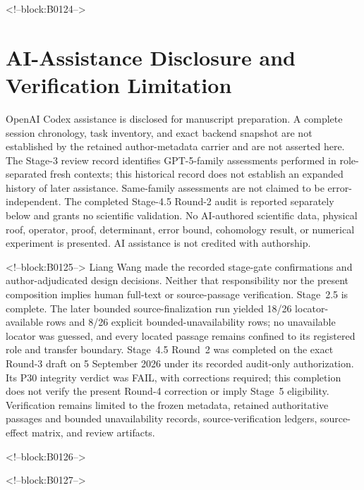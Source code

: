 \documentclass[11pt,a4paper]{article}
\begin{document}
<!--block:B0124-->
\section*{AI-Assistance Disclosure and Verification Limitation}
OpenAI Codex assistance is disclosed for manuscript preparation. A complete session chronology, task inventory, and exact backend snapshot are not established by the retained author-metadata carrier and are not asserted here. The Stage-3 review record identifies GPT-5-family assessments performed in role-separated fresh contexts; this historical record does not establish an expanded history of later assistance. Same-family assessments are not claimed to be error-independent. The completed Stage-4.5 Round-2 audit is reported separately below and grants no scientific validation. No AI-authored scientific data, physical roof, operator, proof, determinant, error bound, cohomology result, or numerical experiment is presented. AI assistance is not credited with authorship.

<!--block:B0125-->
Liang Wang made the recorded stage-gate confirmations and author-adjudicated design decisions. Neither that responsibility nor the present composition implies human full-text or source-passage verification. Stage~2.5 is complete. The later bounded source-finalization run yielded 18/26 locator-available rows and 8/26 explicit bounded-unavailability rows; no unavailable locator was guessed, and every located passage remains confined to its registered role and transfer boundary. Stage~4.5 Round~2 was completed on the exact Round-3 draft on 5 September 2026 under its recorded audit-only authorization. Its P30 integrity verdict was FAIL, with corrections required; this completion does not verify the present Round-4 correction or imply Stage~5 eligibility. Verification remains limited to the frozen metadata, retained authoritative passages and bounded unavailability records, source-verification ledgers, source-effect matrix, and review artifacts.

<!--block:B0126-->



<!--block:B0127-->
\end{document}
